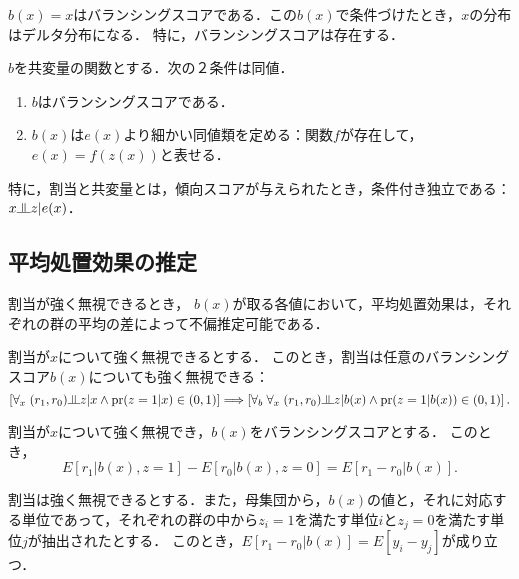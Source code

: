 \documentclass[uplatex,dvipdfmx]{jsreport}
\begin{document}
\begin{example}
    $b(x)=x$はバランシングスコアである．この$b(x)$で条件づけたとき，$x$の分布はデルタ分布になる．
    特に，バランシングスコアは存在する．
\end{example}

\begin{lemma}[バランシングスコアと傾向スコアの特徴付け]
    $b$を共変量の関数とする．次の２条件は同値．
    \begin{enumerate}
        \item $b$はバランシングスコアである．
        \item $b(x)$は$e(x)$より細かい同値類を定める：関数$f$が存在して，$e(x)=f(z(x))$と表せる．
    \end{enumerate}
\end{lemma}

\begin{corollary}
    特に，割当と共変量とは，傾向スコアが与えられたとき，条件付き独立である：
    $x\indep z|e(x)$．
\end{corollary}

\subsection{平均処置効果の推定}

\begin{tcolorbox}[colframe=ForestGreen, colback=ForestGreen!10!white,breakable,colbacktitle=ForestGreen!40!white,coltitle=black,fonttitle=\bfseries\sffamily,
title=]
    割当が強く無視できるとき，
    $b(x)$が取る各値において，平均処置効果は，それぞれの群の平均の差によって不偏推定可能である．
\end{tcolorbox}

\begin{theorem}
    割当が$x$について強く無視できるとする．
    このとき，割当は任意のバランシングスコア$b(x)$についても強く無視できる：
    \[\Square{\forall_{x}\;(r_1,r_0)\indep z|x\land\pr(z=1|x)\in(0,1)}\Longrightarrow\Square{\forall_{b}\;\forall_{x}\;(r_1,r_0)\indep z|b(x)\land\pr(z=1|b(x))\in (0,1)}.\]
\end{theorem}

\begin{theorem}
    割当が$x$について強く無視でき，$b(x)$をバランシングスコアとする．
    このとき，
    \[E[r_1|b(x),z=1]-E[r_0|b(x),z=0]=E[r_1-r_0|b(x)].\]
\end{theorem}

\begin{corollary}
    割当は強く無視できるとする．また，母集団から，$b(x)$の値と，それに対応する単位であって，それぞれの群の中から$z_i=1$を満たす単位$i$と$z_j=0$を満たす単位$j$が抽出されたとする．
    このとき，$E[r_1-r_0|b(x)]=E[y_i-y_j]$が成り立つ．
\end{corollary}
\end{document}
